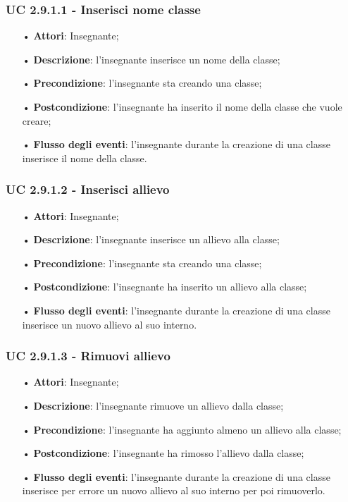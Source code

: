 \subsubsection{UC 2.9.1.1 - Inserisci nome classe}
\begin{itemize}
	\item[•] \textbf{Attori}: Insegnante;
	\item[•] \textbf{Descrizione}: l'insegnante inserisce un nome della classe;
	\item[•] \textbf{Precondizione}: l'insegnante sta creando una classe;
	\item[•] \textbf{Postcondizione}: l'insegnante ha inserito il nome della classe che vuole creare;
	\item[•] \textbf{Flusso degli eventi}: l'insegnante durante la creazione di una classe inserisce il nome della classe.
\end{itemize}

\subsubsection{UC 2.9.1.2 - Inserisci allievo}
\begin{itemize}
	\item[•] \textbf{Attori}: Insegnante;
	\item[•] \textbf{Descrizione}: l'insegnante inserisce un allievo alla classe;
	\item[•] \textbf{Precondizione}: l'insegnante sta creando una classe;
	\item[•] \textbf{Postcondizione}: l'insegnante ha inserito un allievo alla classe;
	\item[•] \textbf{Flusso degli eventi}: l'insegnante durante la creazione di una classe inserisce un nuovo allievo al suo interno.
\end{itemize}

\subsubsection{UC 2.9.1.3 - Rimuovi allievo}
\begin{itemize}
	\item[•] \textbf{Attori}: Insegnante;
	\item[•] \textbf{Descrizione}: l'insegnante rimuove un allievo dalla classe;
	\item[•] \textbf{Precondizione}: l'insegnante ha aggiunto almeno un allievo alla classe;
	\item[•] \textbf{Postcondizione}: l'insegnante ha rimosso l'allievo dalla classe;
	\item[•] \textbf{Flusso degli eventi}: l'insegnante durante la creazione di una classe inserisce per errore un nuovo allievo al suo interno per poi rimuoverlo.
\end{itemize}

